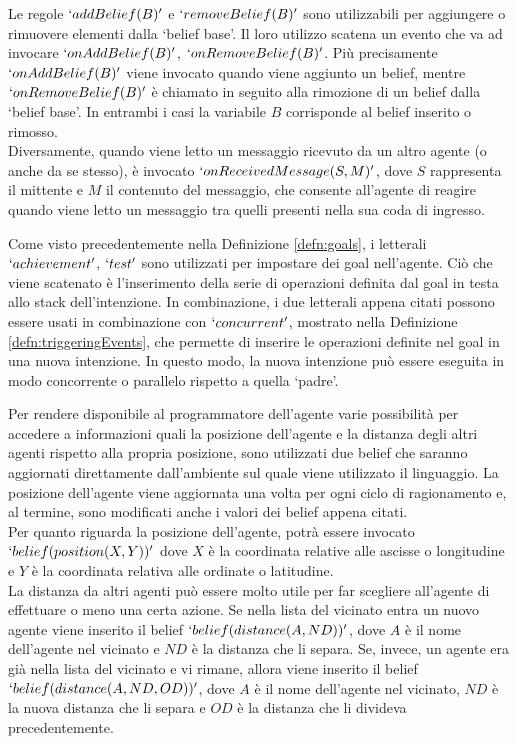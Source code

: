 \medskip
Le regole $`addBelief(B)'$ e $`removeBelief(B)'$ sono utilizzabili per aggiungere o rimuovere elementi dalla `belief base'. Il loro utilizzo scatena un evento che va ad invocare $`onAddBelief(B)'$, $`onRemoveBelief(B)'$. Più precisamente $`onAddBelief(B)'$ viene invocato quando viene aggiunto un belief, mentre $`onRemoveBelief(B)'$ è chiamato in seguito alla rimozione di un belief dalla `belief base'. In entrambi i casi la variabile $B$ corrisponde al belief inserito o rimosso.
\\
Diversamente, quando viene letto un messaggio ricevuto da un altro agente (o anche da se stesso), è invocato $`onReceivedMessage(S, M)'$, dove $S$ rappresenta il mittente e $M$ il contenuto del messaggio, che consente all'agente di reagire quando viene letto un messaggio tra quelli presenti nella sua coda di ingresso.

\medskip
Come visto precedentemente nella Definizione \ref{defn:goals}, i letterali $`achievement'$, $`test'$ sono utilizzati per impostare dei goal nell'agente. Ciò che viene scatenato  è l'inserimento della serie di operazioni definita dal goal in testa allo stack dell'intenzione.
In combinazione, i due letterali appena citati possono essere usati in combinazione con $`concurrent'$, mostrato nella Definizione \ref{defn:triggeringEvents}, che permette di inserire le operazioni definite nel goal in una nuova intenzione. In questo modo, la nuova intenzione può essere eseguita in modo concorrente o parallelo rispetto a quella `padre'.

\medskip
Per rendere disponibile al programmatore dell'agente varie possibilità per accedere a informazioni quali la posizione dell'agente e la distanza degli altri agenti rispetto alla propria posizione, sono utilizzati due belief che saranno aggiornati direttamente dall'ambiente sul quale viene utilizzato il linguaggio. La posizione dell'agente viene aggiornata una volta per ogni ciclo di ragionamento e, al termine, sono modificati anche i valori dei belief appena citati. 
\\
Per quanto riguarda la posizione dell'agente, potrà essere invocato $`belief(position(X, Y))'$ dove $X$ è la coordinata relative alle ascisse o longitudine e $Y$ è la coordinata relativa alle ordinate o latitudine.
\\
La distanza da altri agenti può essere molto utile per far scegliere all'agente di effettuare o meno una certa azione. Se nella lista del vicinato entra un nuovo agente viene inserito il belief $`belief(distance(A, ND))'$, dove $A$ è il nome dell'agente nel vicinato e $ND$ è la distanza che li separa. Se, invece, un agente era già nella lista del vicinato e vi rimane, allora viene inserito il belief $`belief(distance(A, ND, OD))'$, dove $A$ è il nome dell'agente nel vicinato, $ND$ è la nuova distanza che li separa e $OD$ è la distanza che li divideva precedentemente.

